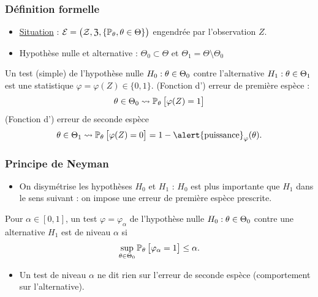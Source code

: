 \begin{frame}
\frametitle{Définition formelle}
\begin{itemize}
\item \underline{Situation} : ${\mathcal E} = \big({\mathcal Z}, \mathfrak{Z}, \{\operatorname{{\mathbb P}}_\theta, \theta \in \Theta\}\big)$ engendrée par l'observation $Z$.
\item \alert{Hypothèse nulle et alternative} : $\Theta_0 \subset \Theta$ et $\Theta_1 = \Theta \setminus \Theta_0$
\end{itemize}
\begin{df} Un test (simple) de l'hypothèse nulle $H_0: \theta \in \Theta_0$ contre l'alternative $H_1:\theta \in \Theta_1$ est une statistique $\varphi  = \varphi(Z) \in \{0,1\}$.
 (Fonction d') \alert{erreur de première espèce} :
$$\theta \in \Theta_0 \leadsto \operatorname{{\mathbb P}}_\theta\big[\varphi(Z) = 1\big]$$
 (Fonction d') \alert{erreur de seconde espèce}
$$\truetheta \in \Theta_1 \leadsto \PP_\truetheta \big[\varphi(Z) = 0\big] = 1- \text{\alert{puissance}}_\varphi(\truetheta).$$
\end{df}
\end{frame}




\begin{frame}
\frametitle{Principe de Neyman}
\begin{itemize}
\item
On  \alert{disymétrise}  les hypothèses $H_0$ et $H_1$
: $H_0$ est  plus importante  que $H_1$ dans le sens suivant : on \alert{ impose} une \alert{erreur de première espèce prescrite}.
\end{itemize}
\begin{df}
Pour $\alpha \in [0,1]$, un test $\varphi = \varphi_\alpha$ de l'hypothèse nulle $H_0:\theta \in \Theta_0$ contre une alternative $H_1$ est de niveau $\alpha$ si
$$\sup_{\theta \in \Theta_0}\operatorname{{\mathbb P}}_\theta\big[\varphi_\alpha = 1\big] \leq \alpha.$$
\end{df}
\begin{itemize}
\item Un test de niveau $\alpha$ ne dit \alert{rien} sur l'erreur de seconde espèce (comportement sur l'alternative).
\end{itemize}
\end{frame}


